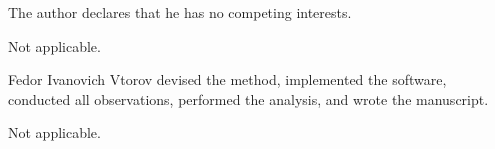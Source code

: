 \documentclass[lineno,pdflatex,sn-basic,referee,]{sn-jnl}
\begin{document}
The author declares that he has no competing interests.

Not applicable.

Fedor Ivanovich Vtorov devised the method, implemented the software, conducted all observations, performed the analysis, and wrote the manuscript.

Not applicable.

\end{document}
